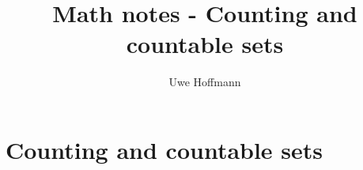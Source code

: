 

\title{Math notes - Counting and countable sets}
\author{Uwe Hoffmann}



\setcounter{chapter}{0}
\chapter{Counting and countable sets}
